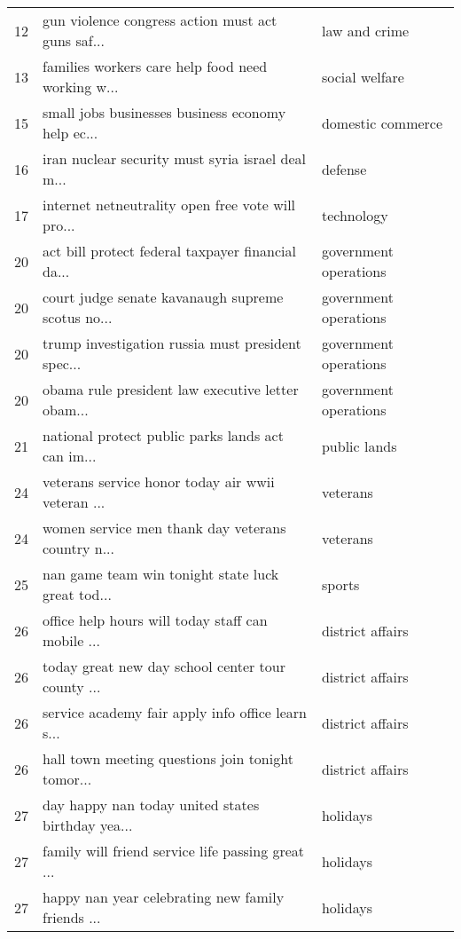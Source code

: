 \begin{tabular}{lll}
12          &  gun violence congress action must act guns saf... &          law and crime \\
13          &  families workers care help food need working w... &         social welfare \\
15          &  small jobs businesses business economy help ec... &      domestic commerce \\
16          &  iran nuclear security must syria israel deal m... &                defense \\
17          &  internet netneutrality open free vote will pro... &             technology \\
20          &  act bill protect federal taxpayer financial da... &  government operations \\
20          &  court judge senate kavanaugh supreme scotus no... &  government operations \\
20          &  trump investigation russia must president spec... &  government operations \\
20          &  obama rule president law executive letter obam... &  government operations \\
21          &  national protect public parks lands act can im... &           public lands \\
24          &  veterans service honor today air wwii veteran ... &               veterans \\
24          &  women service men thank day veterans country n... &               veterans \\
25          &  nan game team win tonight state luck great tod... &                 sports \\
26          &  office help hours will today staff can mobile ... &       district affairs \\
26          &  today great new day school center tour county ... &       district affairs \\
26          &  service academy fair apply info office learn s... &       district affairs \\
26          &  hall town meeting questions join tonight tomor... &       district affairs \\
27          &  day happy nan today united states birthday yea... &               holidays \\
27          &  family will friend service life passing great ... &               holidays \\
27          &  happy nan year celebrating new family friends ... &               holidays \\

\end{tabular}
